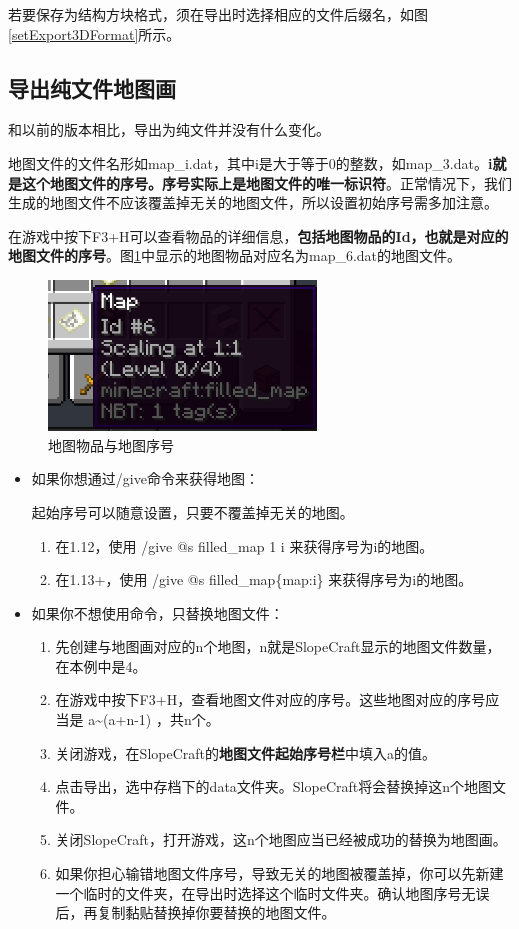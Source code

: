 \documentclass{article}
\begin{document}
    若要保存为结构方块格式，须在导出时选择相应的文件后缀名，如图\ref*{setExport3DFormat}所示。

    \subsection{导出纯文件地图画}
    和以前的版本相比，导出为纯文件并没有什么变化。

    地图文件的文件名形如map\_i.dat，其中i是大于等于0的整数，如map\_3.dat。\textbf{i就是这个地图文件的序号。序号实际上是地图文件的唯一标识符}。正常情况下，我们生成的地图文件不应该覆盖掉无关的地图文件，所以设置初始序号需多加注意。

   在游戏中按下F3+H可以查看物品的详细信息，\textbf{包括地图物品的Id，也就是对应的地图文件的序号}。图\ref*{mapItem}中显示的地图物品对应名为map\_6.dat的地图文件。
   \begin{figure}[htbp]
       \centering
       \includegraphics[height=4cm]{Img8_MapItem.png}
       \caption{地图物品与地图序号}
       \label{mapItem}
   \end{figure}

   \begin{itemize}
       \item 如果你想通过/give命令来获得地图：
       
       起始序号可以随意设置，只要不覆盖掉无关的地图。
       \begin{enumerate}
           \item 在1.12，使用 /give @s filled\_map 1 i 来获得序号为i的地图。
           \item 在1.13+，使用 /give @s filled\_map\{map:i\} 来获得序号为i的地图。
       \end{enumerate}
       \item 如果你不想使用命令，只替换地图文件：
       \begin{enumerate}
           \item 先创建与地图画对应的n个地图，n就是SlopeCraft显示的地图文件数量，在本例中是4。
           \item 在游戏中按下F3+H，查看地图文件对应的序号。这些地图对应的序号应当是 a\textasciitilde(a+n-1) ，共n个。
           \item 关闭游戏，在SlopeCraft的\textbf{地图文件起始序号栏}中填入a的值。
           \item 点击导出，选中存档下的data文件夹。SlopeCraft将会替换掉这n个地图文件。
           \item 关闭SlopeCraft，打开游戏，这n个地图应当已经被成功的替换为地图画。
           \item 如果你担心输错地图文件序号，导致无关的地图被覆盖掉，你可以先新建一个临时的文件夹，在导出时选择这个临时文件夹。确认地图序号无误后，再复制黏贴替换掉你要替换的地图文件。
       \end{enumerate}
   \end{itemize}
   
\end{document}
